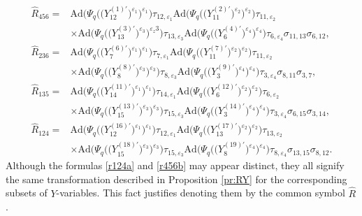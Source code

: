 \documentclass[pdftex]{sigma}
\numberwithin{equation}{section}
\begin{document}
\begin{align}
\widehat{R}_{456} ={}&
\mathrm{Ad}\bigl(\Psi_q\bigl(\bigl(Y^{(1)\prime}_{12}\bigr)^{\varepsilon_1}\bigr)^{\varepsilon_1}\bigr)\tau_{12,\varepsilon_1}
\mathrm{Ad}\bigl(\Psi_q\bigl(\bigl(Y^{(2)\prime}_{11}\bigr)^{\varepsilon_2}\bigr)^{\varepsilon_2}\bigr)\tau_{11,\varepsilon_2}\nonumber
\\
& \times
\mathrm{Ad}\bigl(\Psi_q\bigl(\bigl(Y^{(3)\prime}_{13}\bigr)^{\varepsilon_3}\bigr)^{\varepsilon_z3}\bigr)\tau_{13,\varepsilon_3}
\mathrm{Ad}\bigl(\Psi_q\bigl(\bigl(Y^{(4)\prime}_{6}\bigr)^{\varepsilon_4}\bigr)^{\varepsilon_4}\bigr)\tau_{6,\varepsilon_4}
\sigma_{11,13}\sigma_{6,12},\nonumber
\\
\widehat{R}_{236} ={}&
\mathrm{Ad}\bigl(\Psi_q\bigl(\bigl(Y^{(6)\prime}_{7}\bigr)^{\varepsilon_1}\bigr)^{\varepsilon_1}\bigr)\tau_{7,\varepsilon_1}
\mathrm{Ad}\bigl(\Psi_q\bigl(\bigl(Y^{(7)\prime}_{11}\bigr)^{\varepsilon_2}\bigr)^{\varepsilon_2}\bigr)\tau_{11,\varepsilon_2}\nonumber
\\
& \times
\mathrm{Ad}\bigl(\Psi_q\bigl(\bigl(Y^{(8)\prime}_{8}\bigr)^{\varepsilon_3}\bigr)^{\varepsilon_3}\bigr)\tau_{8,\varepsilon_3}
\mathrm{Ad}\bigl(\Psi_q\bigl(\bigl(Y^{(9)\prime}_{3}\bigr)^{\varepsilon_4}\bigr)^{\varepsilon_4}\bigr)\tau_{3,\varepsilon_4}
\sigma_{8,11}\sigma_{3,7},\nonumber
\\
\widehat{R}_{135} ={}&
\mathrm{Ad}\bigl(\Psi_q\bigl(\bigl(Y^{(11)\prime}_{14}\bigr)^{\varepsilon_1}\bigr)^{\varepsilon_1}\bigr)\tau_{14,\varepsilon_1}
\mathrm{Ad}\bigl(\Psi_q\bigl(\bigl(Y^{(12)\prime}_{6}\bigr)^{\varepsilon_2}\bigr)^{\varepsilon_2}\bigr)\tau_{6,\varepsilon_2}\nonumber
\\
& \times
\mathrm{Ad}\bigl(\Psi_q\bigl(\bigl(Y^{(13)\prime}_{15}\bigr)^{\varepsilon_3}\bigr)^{\varepsilon_3}\bigr)\tau_{15,\varepsilon_3}
\mathrm{Ad}\bigl(\Psi_q\bigl(\bigl(Y^{(14)\prime}_{3}\bigr)^{\varepsilon_4}\bigr)^{\varepsilon_4}\bigr)\tau_{3,\varepsilon_4}
\sigma_{6,15}\sigma_{3,14},\nonumber
\\
\widehat{R}_{124} ={}&
\mathrm{Ad}\bigl(\Psi_q\bigl(\bigl(Y^{(16)\prime}_{12}\bigr)^{\varepsilon_1}\bigr)^{\varepsilon_1}\bigr)\tau_{12,\varepsilon_1}
\mathrm{Ad}\bigl(\Psi_q\bigl(\bigl(Y^{(17)\prime}_{13}\bigr)^{\varepsilon_2}\bigr)^{\varepsilon_2}\bigr)\tau_{13,\varepsilon_2}\nonumber
\\
& \times
\mathrm{Ad}\bigl(\Psi_q\bigl(\bigl(Y^{(18)\prime}_{15}\bigr)^{\varepsilon_3}\bigr)^{\varepsilon_3}\bigr)\tau_{15,\varepsilon_3}
\mathrm{Ad}\bigl(\Psi_q\bigl(\bigl(Y^{(19)\prime}_{8}\bigr)^{\varepsilon_4}\bigr)^{\varepsilon_4}\bigr)\tau_{8,\varepsilon_4}
\sigma_{13,15}\sigma_{8,12}.\label{r456b}
\end{align}
Although the formulas \eqref{r124a} and \eqref{r456b} may appear distinct,
they all signify the same transformation described in Proposition \ref{pr:RY}
for the corresponding subsets of $Y$-variables.
This fact justifies denoting them by the common symbol $\widehat{R}$.
\end{document}
